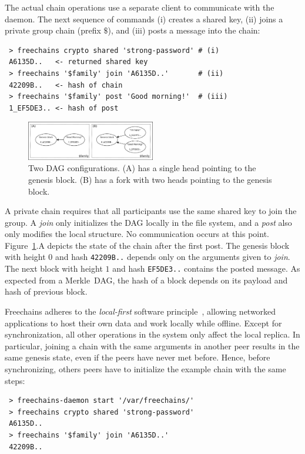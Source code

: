 \documentclass[10pt,journal,compsoc]{IEEEtran}
\newcommand{\FC}       {Freechains\xspace}
\begin{document}
The actual chain operations use a separate client to communicate with the
daemon.
The next sequence of commands (i) creates a shared key, (ii) joins a private
group chain (prefix $\$$), and (iii) posts a message into the chain:

{\footnotesize
\begin{verbatim}
 > freechains crypto shared 'strong-password' # (i)
 A6135D..   <- returned shared key
 > freechains '$family' join 'A6135D..'       # (ii)
 42209B..   <- hash of chain
 > freechains '$family' post 'Good morning!'  # (iii)
 1_EF5DE3.. <- hash of post
\end{verbatim}
}

\begin{figure}[t]
\centering
\includegraphics[width=0.5\textwidth]{family.png}
\caption{Two DAG configurations. (A) has a single head pointing to the
genesis block. (B) has a fork with two heads pointing to the genesis block.}
\label{fig.family}
\end{figure}

A private chain requires that all participants use the same shared key to join
the group.
A \emph{join} only initializes the DAG locally in the file system, and a
\emph{post} also only modifies the local structure.
No communication occurs at this point.
Figure~\ref{fig.family}.A depicts the state of the chain after the first post.
The genesis block with height $0$ and hash \texttt{42209B..}
depends only on the arguments given to \emph{join}.
The next block with height $1$ and hash \texttt{EF5DE3..} contains the posted
message.
As expected from a Merkle~DAG, the hash of a block depends on its payload and
hash of previous block.

\FC adheres to the \emph{local-first} software principle~\cite{p2p.local},
allowing networked applications to host their own data and work locally while
offline.
Except for synchronization, all other operations in the system only affect the
local replica.
In particular, joining a chain with the same arguments in another peer results
in the same genesis state, even if the peers have never met before.
Hence, before synchronizing, others peers have to initialize the example chain
with the same steps:

{\footnotesize
\begin{verbatim}
 > freechains-daemon start '/var/freechains/'
 > freechains crypto shared 'strong-password'
 A6135D..
 > freechains '$family' join 'A6135D..'
 42209B..
\end{verbatim}
}
\end{document}
